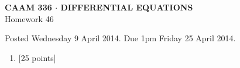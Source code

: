 \documentclass[10pt]{article}
\begin{document}
\vspace*{-5em}
\begin{center}
\large \textsf{\textbf{CAAM 336 $\cdot$ DIFFERENTIAL EQUATIONS}\\[0.5em]
Homework 46 }
\end{center}

Posted Wednesday 9 April 2014.  Due 1pm Friday 25 April 2014.

\begin{enumerate}\addtocounter{enumi}{45}
\item {[25 points]}  
\end{enumerate}
\end{document}
